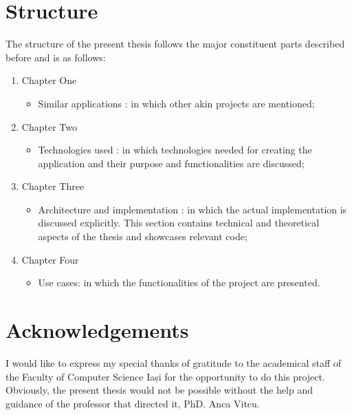 	\section{Structure}
	The structure of the present thesis follows the major constituent parts described before and is as follows:
	\begin{enumerate}
	\item Chapter One
		\begin{itemize}
			\item Similar applications :  in which other akin projects are mentioned;
		\end{itemize}

	\item Chapter Two
		\begin{itemize}
			\item Technologies used : in which technologies needed for creating the application and their purpose and functionalities are discussed;

		\end{itemize}
	\item Chapter Three
		\begin{itemize}
		\item Architecture and implementation : in which the actual implementation is discussed explicitly. This section contains technical and theoretical aspects of the thesis and  showcases relevant code;

		\end{itemize}
	\item Chapter Four
		\begin{itemize}
			\item Use cases:  in which the functionalities of the project are presented.

		\end{itemize}
	\end{enumerate}

 	\section{Acknowledgements}


	I would like to express my special thanks of gratitude to the academical staff of the Faculty of Computer Science Iași for the opportunity to do this project.\\

	Obviously, the present thesis would not be possible without the help and guidance of the professor that directed it, PhD. Anca Vitcu.
